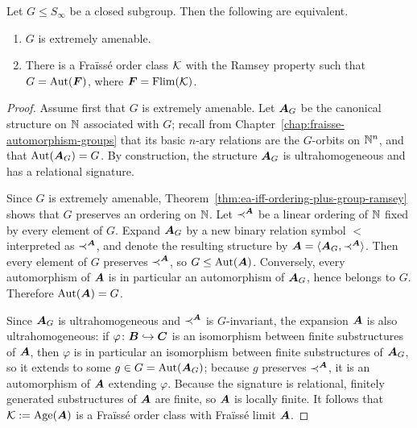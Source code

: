 \begin{theorem}
    \label{thm:ea-iff-fraisse-order-ramsey}
    Let \(G\leq S_\infty\) be a closed subgroup. Then the following are equivalent.
    \begin{enumerate}
        \item[(i)] \(G\) is extremely amenable.
        \item[(ii)] There is a Fraïssé order class \(\mathcal{K}\) with the Ramsey property such that \(G=\operatorname{Aut}(\boldsymbol{F})\), where \(\boldsymbol{F}=\operatorname{Flim}(\mathcal{K})\).
    \end{enumerate}
\end{theorem}

\begin{proof}


    Assume first that \(G\) is extremely amenable. Let \(\boldsymbol{A}_G\) be the canonical structure on \(\mathbb{N}\) associated with \(G\); recall from Chapter~\ref{chap:fraisse-automorphism-groups} that its basic \(n\)-ary relations are the \(G\)-orbits on \(\mathbb{N}^n\), and that \(\operatorname{Aut}(\boldsymbol{A}_G)=G\).
    By construction, the structure \(\boldsymbol{A}_G\) is ultrahomogeneous and has a relational signature.

    Since \(G\) is extremely amenable, Theorem~\ref{thm:ea-iff-ordering-plus-group-ramsey} shows that \(G\) preserves an ordering on \(\mathbb{N}\).
    Let \(\prec^{\boldsymbol{A}}\) be a linear ordering of \(\mathbb{N}\) fixed by every element of \(G\).
    Expand \(\boldsymbol{A}_G\) by a new binary relation symbol \(<\) interpreted as \(\prec^{\boldsymbol{A}}\), and denote the resulting structure by \(\boldsymbol{A}=\langle \boldsymbol{A}_G,\prec^{\boldsymbol{A}}\rangle\).
    Then every element of \(G\) preserves \(\prec^{\boldsymbol{A}}\), so \(G\leq \operatorname{Aut}(\boldsymbol{A})\).
    Conversely, every automorphism of \(\boldsymbol{A}\) is in particular an automorphism of \(\boldsymbol{A}_G\), hence belongs to \(G\).
    Therefore \(\operatorname{Aut}(\boldsymbol{A})=G\).

    Since \(\boldsymbol{A}_G\) is ultrahomogeneous and \(\prec^{\boldsymbol{A}}\) is \(G\)-invariant, the expansion \(\boldsymbol{A}\) is also ultrahomogeneous: if \(\varphi\colon \boldsymbol{B}\hookrightarrow \boldsymbol{C}\) is an isomorphism between finite substructures of \(\boldsymbol{A}\), then \(\varphi\) is in particular an isomorphism between finite substructures of \(\boldsymbol{A}_G\), so it extends to some \(g\in G=\operatorname{Aut}(\boldsymbol{A}_G)\); because \(g\) preserves \(\prec^{\boldsymbol{A}}\), it is an automorphism of \(\boldsymbol{A}\) extending \(\varphi\).
    Because the signature is relational, finitely generated substructures of \(\boldsymbol{A}\) are finite, so \(\boldsymbol{A}\) is locally finite.
    It follows that \(\mathcal{K}:=\operatorname{Age}(\boldsymbol{A})\) is a Fraïssé order class with Fraïssé limit \(\boldsymbol{A}\).


\end{proof}
